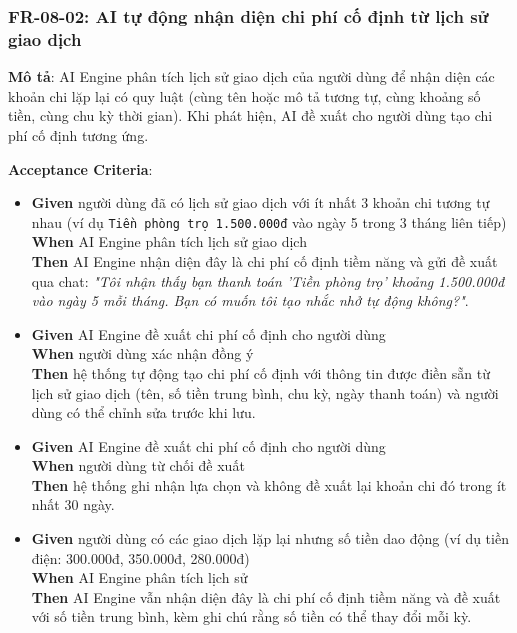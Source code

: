 \subsubsection{FR-08-02: AI tự động nhận diện chi phí cố định từ lịch sử giao dịch}

\textbf{Mô tả}: AI Engine phân tích lịch sử giao dịch của người dùng để nhận diện các khoản chi lặp lại có quy luật (cùng tên hoặc mô tả tương tự, cùng khoảng số tiền, cùng chu kỳ thời gian). Khi phát hiện, AI đề xuất cho người dùng tạo chi phí cố định tương ứng.



\textbf{Acceptance Criteria}:

\begin{itemize}
\item \textbf{Given} người dùng đã có lịch sử giao dịch với ít nhất 3 khoản chi tương tự nhau (ví dụ \texttt{Tiền phòng trọ 1.500.000đ} vào ngày 5 trong 3 tháng liên tiếp)  \\ \hspace*{1.5em}  \textbf{When} AI Engine phân tích lịch sử giao dịch  \\ \hspace*{1.5em}  \textbf{Then} AI Engine nhận diện đây là chi phí cố định tiềm năng và gửi đề xuất qua chat: \textit{"Tôi nhận thấy bạn thanh toán 'Tiền phòng trọ' khoảng 1.500.000đ vào ngày 5 mỗi tháng. Bạn có muốn tôi tạo nhắc nhở tự động không?"}.
\item \textbf{Given} AI Engine đề xuất chi phí cố định cho người dùng  \\ \hspace*{1.5em}  \textbf{When} người dùng xác nhận đồng ý  \\ \hspace*{1.5em}  \textbf{Then} hệ thống tự động tạo chi phí cố định với thông tin được điền sẵn từ lịch sử giao dịch (tên, số tiền trung bình, chu kỳ, ngày thanh toán) và người dùng có thể chỉnh sửa trước khi lưu.
\item \textbf{Given} AI Engine đề xuất chi phí cố định cho người dùng  \\ \hspace*{1.5em}  \textbf{When} người dùng từ chối đề xuất  \\ \hspace*{1.5em}  \textbf{Then} hệ thống ghi nhận lựa chọn và không đề xuất lại khoản chi đó trong ít nhất 30 ngày.
\item \textbf{Given} người dùng có các giao dịch lặp lại nhưng số tiền dao động (ví dụ tiền điện: 300.000đ, 350.000đ, 280.000đ)  \\ \hspace*{1.5em}  \textbf{When} AI Engine phân tích lịch sử  \\ \hspace*{1.5em}  \textbf{Then} AI Engine vẫn nhận diện đây là chi phí cố định tiềm năng và đề xuất với số tiền trung bình, kèm ghi chú rằng số tiền có thể thay đổi mỗi kỳ.

\end{itemize}
